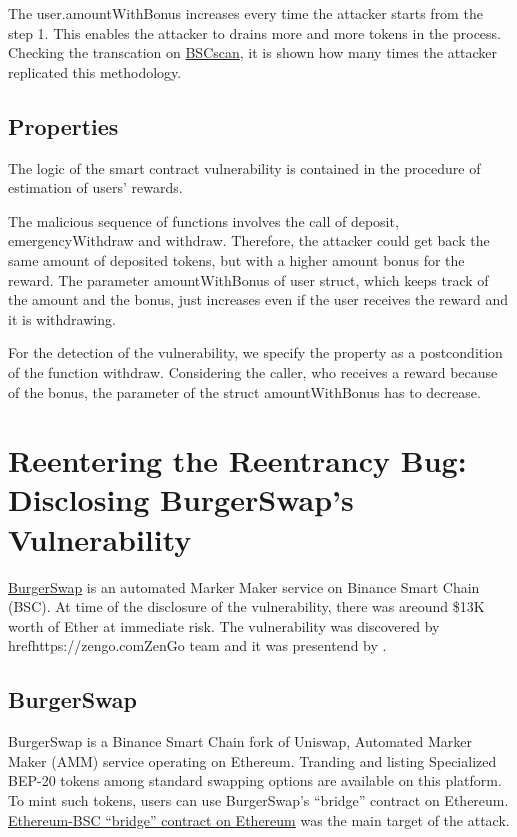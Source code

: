 The user.amountWithBonus increases every time the attacker starts from the step 1. 
This enables the attacker to drains more and more tokens in the process. 
Checking the transcation on \href{https://bscscan.com/txs?a=0x36ad9ee78bfb730955993d2aa77ecccf95e3313e&p=3}{BSCscan}, it is shown how many times the attacker 
replicated this methodology. 

\subsection{Properties}
The logic of the smart contract vulnerability is contained in the procedure of estimation of users' rewards.

The malicious sequence of functions involves the call of deposit, emergencyWithdraw and withdraw.
Therefore, the attacker could get back the same amount of deposited tokens, but with a higher amount bonus for the reward. 
The parameter amountWithBonus of user struct, which keeps track of the amount and the bonus, just increases even if the user receives the reward and it is withdrawing. 

For the detection of the vulnerability, we specify the property as a postcondition of the function withdraw. 
Considering the caller, who receives a reward because of the bonus, 
the parameter of the struct amountWithBonus has to decrease. 

\section{Reentering the Reentrancy Bug: Disclosing BurgerSwap's Vulnerability}   
\label{sec:Exploits:BurgerSwap}
\href{https://burgerswap.org/trade/swap}{BurgerSwap} is an automated Marker Maker service on Binance Smart Chain (BSC). 
At time of the disclosure of the vulnerability, there was areound \$13K worth of Ether at immediate risk.
The vulnerability was discovered by href{https://zengo.com}{ZenGo} team and it was presentend by \citet{BurgerSwap}.

\subsection{BurgerSwap}
\label{sec:BurgerSwap:brige}
BurgerSwap is a Binance Smart Chain fork of Uniswap, Automated Marker Maker (AMM) service operating on Ethereum. 
Tranding and listing Specialized BEP-20 tokens among standard swapping options are available on this platform. 
To mint such tokens, users can use 
BurgerSwap's “bridge” contract on Ethereum. 
\href{https://etherscan.io/address/0xaf5dcebba2f8bec8729117336b2fe8b4e0d99b0b#code}{Ethereum-BSC “bridge” contract on Ethereum} was the main target of the attack.


